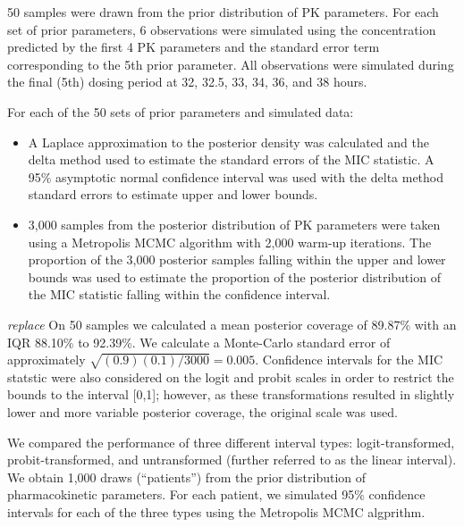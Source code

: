 \documentclass{article}\usepackage[]{graphicx}\usepackage[]{color}
\begin{document}
50 samples were drawn from the prior distribution of PK parameters. For each set of prior parameters, 6 observations were simulated using the concentration predicted by the first 4 PK parameters and the standard error term corresponding to the 5th prior parameter. All observations were simulated during the final (5th) dosing period at 32, 32.5, 33, 34, 36, and 38 hours.

For each of the 50 sets of prior parameters and simulated data:

\begin{itemize}
	 \item A Laplace approximation to the posterior density was calculated and the delta method used to estimate the standard errors of the MIC statistic. A 95\% asymptotic normal confidence interval was used with the delta method standard errors to estimate upper and lower bounds.
	 \item 3,000 samples from the posterior distribution of PK parameters were taken using a Metropolis MCMC algorithm with 2,000 warm-up iterations. The proportion of the 3,000 posterior samples falling within the upper and lower bounds was used to estimate the proportion of the posterior distribution of the MIC statistic falling within the confidence interval.
\end{itemize}

{\it replace}
On 50 samples we calculated a mean posterior coverage of 89.87\% with an IQR 88.10\% to 92.39\%. We calculate a Monte-Carlo standard error of approximately $\sqrt{(0.9)(0.1)/3000} = 0.005$. Confidence intervals for the MIC statstic were also considered on the logit and probit scales in order to restrict the bounds to the interval [0,1]; however, as these transformations resulted in slightly lower and more variable posterior coverage, the original scale was used.


We compared the performance of three different interval types: logit-transformed, probit-transformed, and untransformed (further referred to as the linear interval). We obtain 1,000 draws (``patients'') from the prior distribution of pharmacokinetic parameters. For each patient, we simulated 95\% confidence intervals for each of the three types using the Metropolis MCMC algprithm.
\end{document}
